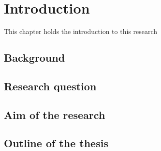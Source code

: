 \chapter{Introduction}

This chapter holds the introduction to this research

\section{Background}

\section{Research question}

\section{Aim of the research}

\section{Outline of the thesis}